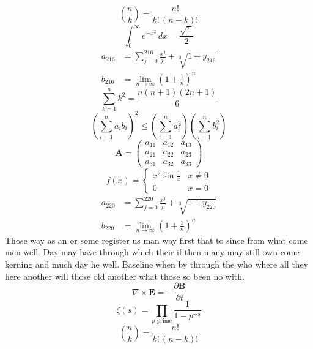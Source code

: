 \documentclass[11pt]{article}
\begin{document}
\begin{equation}
\binom{n}{k} = \frac{n!}{k!\,(n-k)!}
\end{equation}
\begin{equation}
\int_0^\infty e^{-x^2}\,dx = \frac{\sqrt{\pi}}{2}
\end{equation}
\begin{align}
  a_{216} &= \sum_{j=0}^{216} \frac{x^j}{j!} + \sqrt[3]{1+y_{216}} \\
  b_{216} &= \lim_{n\to\infty} \left(1+\frac{1}{n}\right)^{n}
\end{align}
\begin{equation}
\sum_{k=1}^{n} k^2 = \frac{n(n+1)(2n+1)}{6}
\end{equation}
\begin{equation}
\left( \sum_{i=1}^n a_i b_i \right)^2 \le \left(\sum_{i=1}^n a_i^2\right)\left(\sum_{i=1}^n b_i^2\right)
\end{equation}
\begin{equation}
\mathbf{A} = \begin{pmatrix} a_{11} & a_{12} & a_{13} \\ a_{21} & a_{22} & a_{23} \\ a_{31} & a_{32} & a_{33} \end{pmatrix}
\end{equation}
\begin{equation}
f(x) = \begin{cases} x^2 \sin\frac{1}{x} & x \ne 0 \\ 0 & x = 0 \end{cases}
\end{equation}
\begin{align}
  a_{220} &= \sum_{j=0}^{220} \frac{x^j}{j!} + \sqrt[3]{1+y_{220}} \\
  b_{220} &= \lim_{n\to\infty} \left(1+\frac{1}{n}\right)^{n}
\end{align}
Those way as an or some register us man way first that to since from what come men well. Day may have through which their if then many may still own come kerning and much day he well. Baseline when by through the who where all they here another will those old another what those so been no with.
\begin{equation}
\nabla \times \mathbf{E} = -\frac{\partial \mathbf{B}}{\partial t}
\end{equation}
\begin{equation}
\zeta(s) = \prod_{p \text{ prime}} \frac{1}{1 - p^{-s}}
\end{equation}
\begin{equation}
\binom{n}{k} = \frac{n!}{k!\,(n-k)!}
\end{equation}
\end{document}
